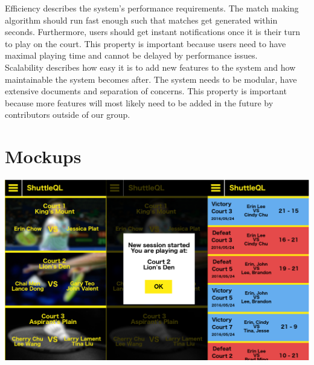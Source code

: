 \documentclass{article}
\begin{document}
Efficiency describes the system's performance requirements.
The match making algorithm should run fast enough such that matches get generated within seconds.
Furthermore, users should get instant notifications once it is their turn to play on the court.
This property is important because users need to have maximal playing time and cannot be delayed by performance issues. \\

Scalability describes how easy it is to add new features to the system and how maintainable the system becomes after. The system needs to be modular, have extensive documents and separation of concerns.
This property is important because more features will most likely need to be added in the future by contributors outside of our group. \\

\newpage

\section{Mockups}
\includegraphics[width=15cm]{combined}
\end{document}
